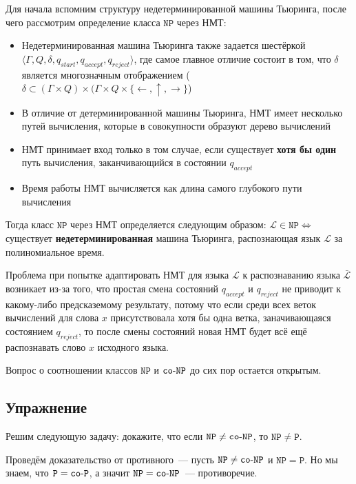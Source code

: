 \documentclass[
    11pt,
    a4paper
]{article}
\theoremstyle{definition}
\begin{document}
Для начала вспомним структуру недетерминированной машины Тьюринга, после чего рассмотрим определение класса $\mathtt{NP}$ через НМТ:
\begin{itemize}
\item Недетерминированная машина Тьюринга также задается шестёркой $\langle \Gamma, Q, \delta, q_{start}, q_{accept}, q_{reject} \rangle$, где самое главное отличие состоит в том, что $\delta$ является многозначным отображением ($\delta \subset (\Gamma \times Q) \times (\Gamma \times Q \times \{\leftarrow, \uparrow, \rightarrow\}$)
\item В отличие от детерминированной машины Тьюринга, НМТ имеет несколько путей вычисления, которые в совокупности образуют дерево вычислений
\item НМТ принимает вход только в том случае, если существует \textbf{хотя бы один} путь вычисления, заканчивающийся в состоянии $q_{accept}$ 
\item Время работы НМТ вычисляется как длина самого глубокого пути вычисления
\end{itemize}

Тогда класс $\mathtt{NP}$ через НМТ определяется следующим образом: $\mathcal{L} \in \mathtt{NP} \Leftrightarrow $ существует \textbf{недетерминированная} машина Тьюринга, распознающая язык $\mathcal{L}$ за полиномиальное время.

Проблема при попытке адаптировать НМТ для языка $\mathcal{L}$ к распознаванию языка $\bar{\mathcal{L}}$ возникает из-за того, что простая смена состояний $q_{accept}$ и $q_{reject}$ не приводит к какому-либо предсказемому результату, потому что если среди всех веток вычислений для слова $x$ присутствовала хотя бы одна ветка, заначивающаяся состоянием $q_{reject}$, то после смены состояний новая НМТ будет всё ещё распознавать слово $x$ исходного языка. 

Вопрос о соотношении классов $\mathtt{NP}$ и $\mathtt{co{\text -}NP}$ до сих пор остается открытым.

\subsection{Упражнение}

Решим следующую задачу: докажите, что если $\mathtt{NP} \ne \mathtt{co{\text -}NP}$, то $\mathtt{NP} \ne \mathtt{P}$.

Проведём доказательство от противного~--- пусть $\mathtt{NP} \ne \mathtt{co{\text -}NP}$ и $\mathtt{NP} = \mathtt{P}$. Но мы знаем, что $\mathtt{P} = \mathtt{co{\text -}P}$, а значит $\mathtt{NP} = \mathtt{co{\text -}NP}$~--- противоречие.
\end{document}
